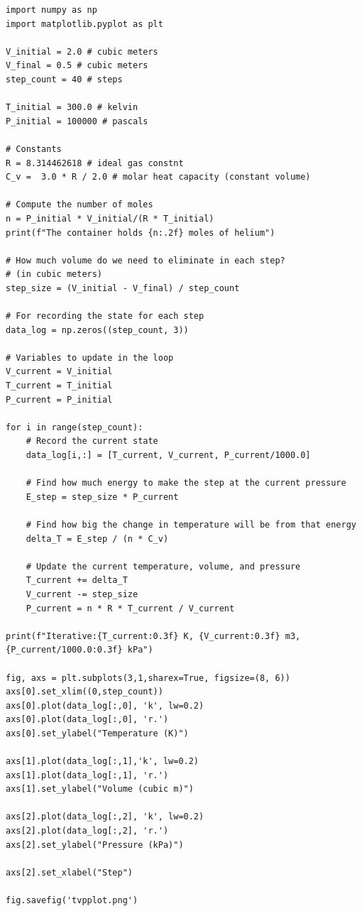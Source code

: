 \begin{Verbatim}
import numpy as np
import matplotlib.pyplot as plt

V_initial = 2.0 # cubic meters
V_final = 0.5 # cubic meters
step_count = 40 # steps

T_initial = 300.0 # kelvin
P_initial = 100000 # pascals

# Constants
R = 8.314462618 # ideal gas constnt
C_v =  3.0 * R / 2.0 # molar heat capacity (constant volume)

# Compute the number of moles
n = P_initial * V_initial/(R * T_initial) 
print(f"The container holds {n:.2f} moles of helium")

# How much volume do we need to eliminate in each step? 
# (in cubic meters)
step_size = (V_initial - V_final) / step_count

# For recording the state for each step
data_log = np.zeros((step_count, 3))

# Variables to update in the loop
V_current = V_initial
T_current = T_initial
P_current = P_initial

for i in range(step_count):
    # Record the current state
    data_log[i,:] = [T_current, V_current, P_current/1000.0]

    # Find how much energy to make the step at the current pressure
    E_step = step_size * P_current

    # Find how big the change in temperature will be from that energy
    delta_T = E_step / (n * C_v)

    # Update the current temperature, volume, and pressure
    T_current += delta_T
    V_current -= step_size
    P_current = n * R * T_current / V_current

print(f"Iterative:{T_current:0.3f} K, {V_current:0.3f} m3, {P_current/1000.0:0.3f} kPa")

fig, axs = plt.subplots(3,1,sharex=True, figsize=(8, 6))
axs[0].set_xlim((0,step_count))
axs[0].plot(data_log[:,0], 'k', lw=0.2)
axs[0].plot(data_log[:,0], 'r.')
axs[0].set_ylabel("Temperature (K)")

axs[1].plot(data_log[:,1],'k', lw=0.2)
axs[1].plot(data_log[:,1], 'r.')
axs[1].set_ylabel("Volume (cubic m)")

axs[2].plot(data_log[:,2], 'k', lw=0.2)
axs[2].plot(data_log[:,2], 'r.')
axs[2].set_ylabel("Pressure (kPa)")

axs[2].set_xlabel("Step")

fig.savefig('tvpplot.png')
\end{Verbatim}

